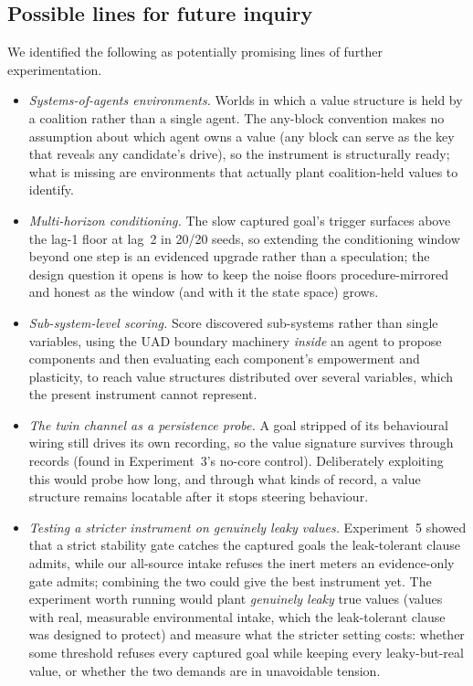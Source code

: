 \documentclass[11pt]{article}
\begin{document}
\subsection{Possible lines for future inquiry}
We identified the following as potentially promising lines of further experimentation.
\begin{itemize}[leftmargin=1.5em]
\item \emph{Systems-of-agents environments.} Worlds in which a value structure is
  held by a coalition rather than a single agent. The any-block convention makes no
  assumption about which agent owns a value (any block can serve as the key that
  reveals any candidate's drive), so the instrument is structurally ready; what is
  missing are environments that actually plant coalition-held values to identify.
\item \emph{Multi-horizon conditioning.} The slow captured goal's trigger surfaces
  above the lag-1 floor at lag~2 in 20/20 seeds, so extending the conditioning window
  beyond one step is an evidenced upgrade rather than a speculation; the design
  question it opens is how to keep the noise floors procedure-mirrored and honest as
  the window (and with it the state space) grows.
\item \emph{Sub-system-level scoring.} Score discovered sub-systems rather than
  single variables, using the UAD boundary machinery \emph{inside} an agent to
  propose components and then evaluating each component's empowerment and plasticity,
  to reach value structures distributed over several variables, which the present
  instrument cannot represent.
\item \emph{The twin channel as a persistence probe.} A goal stripped of its
  behavioural wiring still drives its own recording, so the value signature survives through
  records (found in Experiment~3's no-core control). Deliberately exploiting this would probe how
  long, and through what kinds of record, a value structure remains locatable after it
  stops steering behaviour.
\item \emph{Testing a stricter instrument on genuinely leaky values.} Experiment~5
  showed that a strict stability gate catches the captured goals the leak-tolerant
  clause admits, while our all-source intake refuses the inert meters an evidence-only
  gate admits; combining the two could give the best instrument yet. The experiment
  worth running would plant \emph{genuinely leaky} true values (values with real,
  measurable environmental intake, which the leak-tolerant clause was designed to
  protect) and measure what the stricter setting costs: whether some threshold refuses
  every captured goal while keeping every leaky-but-real value, or whether the two
  demands are in unavoidable tension.
\end{itemize}
\end{document}
